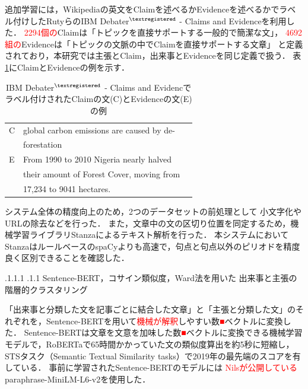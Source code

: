 \documentclass[a4paper, twocolumn, 10pt]{jarticle}
\makeatletter
\def\subsection{%
	\@startsection{subsection}{1}{\z@}%
	{.1\Cvs \@plus.1\Cdp \@minus.1\Cdp}%
	{.1\Cvs \@plus.1\Cdp}%
	{\normalfont\normalsize\bfseries}%
}
\makeatother
\begin{document}
追加学習には，Wikipediaの英文をClaimを述べるかEvidenceを述べるかでラベル付けしたRutyらのIBM Debater$^{\textregistered}$ - Claims and Evidenceを利用した\cite{rinott_show_2015}．
\textcolor{red}{2294個の}Claimは「トピックを直接サポートする一般的で簡潔な文」，
\textcolor{red}{4692組の}Evidenceは「トピックの文脈の中でClaimを直接サポートする文章」
と定義されており，本研究では主張とClaim，出来事とEvidenceを同じ定義で扱う．
表\ref{claim_evidence_example}にClaimとEvidenceの例を示す．

\begin{table}[h]
  \caption{IBM Debater$^{\textregistered}$ - Claims and Evidencでラベル付けされたClaimの文(C)とEvidenceの文(E)の例}
  \centering
  \begin{tabular}{llp{6cm}}
    \hline
    C & global carbon emissions are caused by de-
    \\
    & forestation
    \\
    E & From 1990 to 2010 Nigeria nearly halved
    \\
    & their amount of Forest Cover, moving from
    \\
    & 17,234 to 9041 hectares.
    \\
    \hline
  \end{tabular}
  \label{claim_evidence_example}
\end{table}

システム全体の精度向上のため，2つのデータセットの前処理として
小文字化やURLの除去などを行った．
また，文章中の文の区切り位置を同定するため，機械学習ライブラリStanzaによるテキスト解析を行った\cite{qi_stanza_2020}．
本システムにおいてStanzaはルールベースのspaCyよりも高速で，句点と句点以外のピリオドを精度良く区別できることを確認した．



\subsection{
Sentence-BERT，コサイン類似度，Ward法を用いた
出来事と主張の
階層的クラスタリング
}

「出来事と分類した文を記事ごとに結合した文章」と「主張と分類した文」のそれぞれを，Sentence-BERTを用いて\textcolor{red}{機械が解釈}しやすい数\textcolor{red}{■}ベクトルに変換した．
Sentence-BERTは文章を文意を加味した数\textcolor{red}{■}ベクトルに変換できる機械学習モデルで，RoBERTaで65時間かかっていた文の類似度算出を約5秒に短縮し，STSタスク（Semantic Textual Similarity tasks）で2019年の最先端のスコアを有している\cite{reimers_sentence-bert_2019}．
事前に学習されたSentence-BERTのモデルには
\textcolor{red}{Nilsが公開している}paraphrase-MiniLM-L6-v2を使用した．
\end{document}
